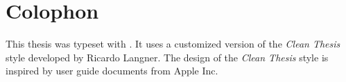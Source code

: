 \pagestyle{empty}
\hfill
\vfill
{}
\section*{Colophon}

This thesis was typeset with \LaTeXe.
It uses a customized version of the \textit{Clean Thesis} style developed by Ricardo Langner.
The design of the \textit{Clean Thesis} style is inspired by user guide documents from Apple Inc.

